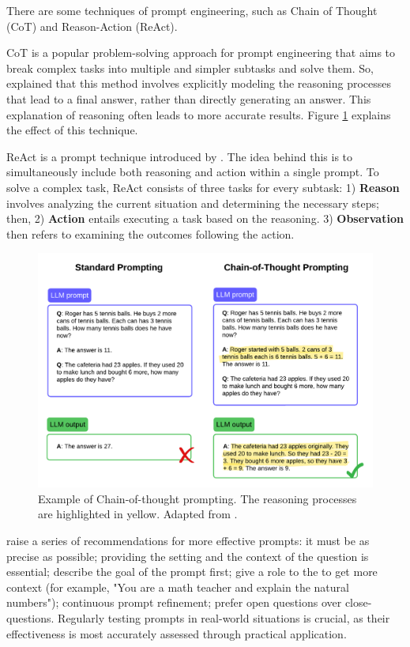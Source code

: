 There are some techniques of prompt engineering, such as Chain of Thought (CoT) and Reason-Action (ReAct). 

CoT is a popular problem-solving approach for prompt engineering that aims to break complex tasks into multiple and simpler subtasks and solve them. So, \citet{wei_chain--thought_2023} explained that this method involves explicitly modeling the reasoning processes that lead to a final answer, rather than directly generating an answer. This explanation of reasoning often leads to more accurate results. Figure \ref{fig_cot} explains the effect of this technique.

ReAct is a prompt technique introduced by \citet{yao_react_2023}. The idea behind this is to simultaneously include both reasoning and action within a single prompt. To solve a complex task, ReAct consists of three tasks for every subtask: 1) \textbf{Reason} involves analyzing the current situation and determining the necessary steps; then, 2) \textbf{Action} entails executing a task based on the reasoning. 3) \textbf{Observation} then refers to examining the outcomes following the action.


\begin{figure}[ht]
    \includegraphics[width=14cm]{figs/chapter2/CoT.png}
    \centering
    \caption{Example of Chain-of-thought prompting. The reasoning processes are highlighted in yellow. Adapted from \citet{wei_chain--thought_2023}.}
    \label{fig_cot}
\end{figure}


\citet{mesko_prompt_2023} raise a series of recommendations for more effective {\llm} prompts: it must be as precise as possible; providing the setting and the context of the question is essential; describe the goal of the prompt first; give a role to the {\llm} to get more context (for example, "You are a math teacher and explain the natural numbers"); continuous {\llm} prompt refinement; prefer open questions over close-questions. Regularly testing prompts in real-world situations is crucial, as their effectiveness is most accurately assessed through practical application.



